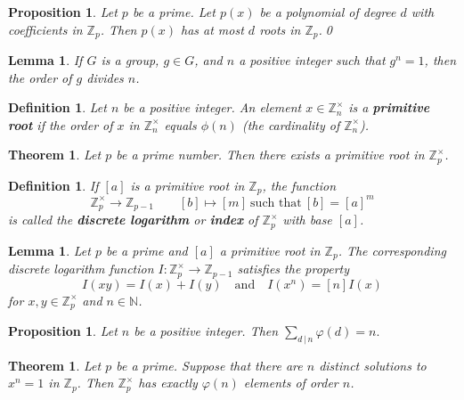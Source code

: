 \documentclass[12pt]{amsart}
\newcommand{\N}{\mathbb{N}}
\newcommand{\Z}{\mathbb{Z}}
\numberwithin{equation}{section}
\theoremstyle{plain} %
\newtheorem{thm}	[section]	{Theorem}
\newtheorem{lem}	[section]	{Lemma}
\newtheorem{prop}	[section]	{Proposition}
\newtheorem{defn}	[section]	{Definition}
\begin{document}
\begin{prop} Let $p$ be a prime. Let $p(x)$ be a polynomial of degree $d$ with coefficients in $\Z_p$. Then $p(x)$ has at most $d$ roots in $\Z_p$.\qed
\end{prop}

\begin{lem} If $G$ is a group, $g\in G$, and $n$ a positive integer such that $g^n=1$, then the order of $g$ divides $n$.
\end{lem}


\begin{defn} Let $n$ be a positive integer. An element $x \in \Z_n^\times$ is a \textbf{primitive root} if the order of $x$ in $\Z_n^\times$ equals $\phi(n)$ (the cardinality of $\Z_n^\times$).
\end{defn}

\begin{thm} Let $p$ be a prime number. Then there exists a primitive root in $\Z_p^\times$.
\end{thm}

\begin{defn} If $[a]$ is a primitive root in $\Z_p$, the function
\[ \Z_p^\times \to \Z_{p-1} \qquad [b]\mapsto [m] \ \text{such that} \ [b]=[a]^m\]
is called the \textbf{discrete logarithm} or \textbf{index} of $\Z_p^\times$ with base $[a]$.
\end{defn}

\begin{lem} Let $p$ be a prime and $[a]$ a primitive root in $\Z_p$. The corresponding discrete logarithm function $I: \Z_p^\times \to \Z_{p-1}$ satisfies the property
\[ I( xy) = I(x) + I(y) \quad \text{and} \quad I(x^n) = [n] I(x)\]
for $x,y\in \Z_p^\times$ and $n\in \N$.
\end{lem}


\begin{prop} Let $n$ be a positive integer. Then $\displaystyle \sum_{d \, |\, n} \varphi(d) = n.$
\end{prop}

\begin{thm} Let $p$ be a prime. Suppose that there are $n$ distinct solutions to $x^n=1$ in $\Z_p$. Then $\Z_p^\times$ has exactly $\varphi(n)$ elements of order $n$.
\end{thm}
\end{document}
